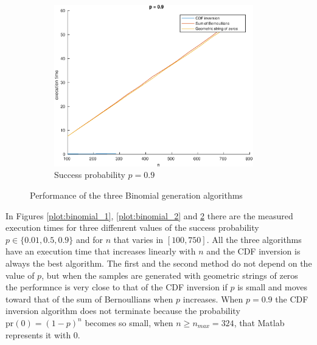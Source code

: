 \documentclass[a4paper,oneside]{article}
\begin{document}
\begin{figure}[htbp]
\begin{subfigure}{0.5\textwidth}
    \centering
    \includegraphics[width=0.95\textwidth]{binomial_gen_3}
    \caption{Success probability $p=0.9$}
    \label{plot:binomial_3}
  \end{subfigure}
  \caption{Performance of the three Binomial generation algorithms}
\end{figure}

In Figures \ref{plot:binomial_1}, \ref{plot:binomial_2} and
\ref{plot:binomial_3} there are the measured execution times for three
diffenrent values of the success probability $p \in \{ 0.01, 0.5, 0.9
\}$ and for $n$ that varies in $[100, 750]$. All the three algorithms
have an execution time that increases linearly with $n$ and the CDF
inversion is always the best algorithm. The first and the second
method do not depend on the value of $p$, but when the samples are
generated with geometric strings of zeros the performnce is very close
to that of the CDF inversion if $p$ is small and moves toward that of
the sum of Bernoullians when $p$ increases. When $p=0.9$ the CDF
inversion algorithm does not terminate because the probability
$\mathrm{pr}(0) = (1-p)^n$ becomes so small, when $n \geq n_{max} =
324$, that Matlab represents it with 0.
\end{document}
